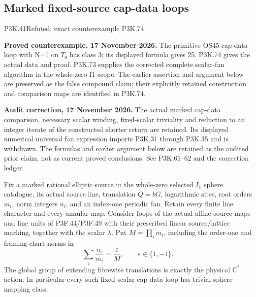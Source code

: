\subsection{Marked fixed-source cap-data loops}
\begin{statement}{P3K.41}{Refuted; exact counterexample P3K.74}
\par\noindent\textbf{Proved counterexample, 17 November 2026.} The primitive OS45 cap-data loop with N=1 on \(T_0\) has class 3; its displayed formula gives 25. P3K.74 gives the actual data and proof. P3K.73 supplies the corrected complete scalar-fan algorithm in the whole-zero I1 scope. The earlier assertion and argument below are preserved as the false compound claim; their explicitly retained construction and comparison maps are identified in P3K.74.

\par\noindent\textbf{Audit correction, 17 November 2026.} The actual marked cap-data comparison, necessary scalar winding, fixed-scalar triviality and reduction to an integer iterate of the constructed shorter return are retained. Its displayed numerical universal fan expression imports P3K.31 through P3K.35 and is withdrawn. The formulas and earlier argument below are retained as the audited prior claim, not as current proved conclusions. See P3K.61--62 and the correction ledger.
\medskip


Fix a marked rational elliptic source in the whole-zero selected
\(I_1\) sphere catalogue, its actual source line, translation
\(Q=bG\), logarithmic sites, root orders \(m_i\), norm integers
\(n_i\), and an index-one periodic fan. Retain every finite line
character and every annular map. Consider loops of the actual affine
source maps and line units of P3F.44/P3F.49 with their prescribed
linear source/lattice marking, together with the scalar \(\lambda\).
Put \(M=\prod_i m_i\), including the order-one and framing-chart
norms in
\[
           \sum_i\frac{n_i}{m_i}=\frac{\varepsilon}{M},
                \qquad\varepsilon\in\{1,-1\}.
\]
The global group of extending fibrewise translations is exactly
the physical \(\mathbb C^*\) action. In particular every such
fixed-scalar cap-data loop has trivial sphere mapping class.


\end{statement}
